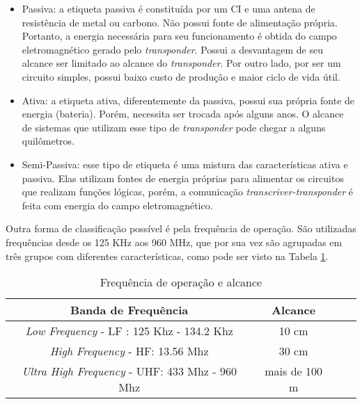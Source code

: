 \documentclass[tcc,capa]{texufpel}
\begin{document}
            \begin{itemize}
            
                \item Passiva: a etiqueta passiva é constituída por um CI e uma antena de resistência de metal ou carbono. Não possui fonte de alimentação própria. Portanto, a energia necessária para seu funcionamento é obtida do campo eletromagnético gerado pelo \textit{transponder}. Possui a desvantagem de seu alcance ser limitado ao alcance do \textit{transponder}. Por outro lado, por ser um circuito simples, possui baixo custo de produção e maior ciclo de vida útil.
                
                \item Ativa: a etiqueta ativa, diferentemente da passiva, possui sua própria fonte de energia (bateria). Porém, necessita ser trocada após alguns anos. O alcance de sistemas que utilizam esse tipo de \textit{transponder} pode chegar a alguns quilômetros. 
                 
                \item Semi-Passiva: esse tipo de etiqueta é uma mistura das características ativa e passiva. Elas utilizam fontes de energia próprias para alimentar os circuitos que realizam funções lógicas, porém, a comunicação \textit{transcriver-transponder} é feita com energia do campo eletromagnético. 
            
            \end{itemize}
            
            Outra forma de  classificação possível é pela frequência de operação. São utilizadas frequências desde os 125 KHz aos 960 MHz, que por sua vez são agrupadas em três grupos com diferentes características, como pode ser visto na Tabela  \ref{tabelaSintDSs}.
            
            \begin{table}[htbp]
                \begin{center}
                \caption{Frequência de operação e alcance}\label{tabelaSintDSs}
                \begin{tabular}{|c|c|c|c}
                \hline
                \hline
                \textbf{Banda de Frequência} &  \textbf{Alcance} \\
                \hline
                \hline
                {\small {\textit{Low Frequency} - LF : 125 Khz - 134.2 Khz}} 	& {\small 10 cm} \\
                \hline
                {\small {\textit{ High Frequency} - HF: 13.56 Mhz}} 			& {\small 30 cm}\\
                \hline
                {\small {\textit{ Ultra High Frequency} - UHF: 433 Mhz - 960 Mhz}} 		& {\small mais de 100 m}\\
                \hline
                
                \hline
                \end{tabular}
                \end{center}
            \end{table}
        
\end{document}
